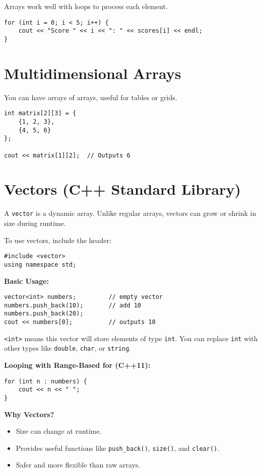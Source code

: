 \documentclass{article}
\begin{document}
Arrays work well with loops to process each element.

\begin{lstlisting}[style=cppstyle]
for (int i = 0; i < 5; i++) {
    cout << "Score " << i << ": " << scores[i] << endl;
}
\end{lstlisting}

\section{Multidimensional Arrays}

You can have arrays of arrays, useful for tables or grids.

\begin{lstlisting}[style=cppstyle]
int matrix[2][3] = {
    {1, 2, 3},
    {4, 5, 6}
};

cout << matrix[1][2];  // Outputs 6
\end{lstlisting}

\section{Vectors (C++ Standard Library)}

A \texttt{vector} is a dynamic array. Unlike regular arrays, vectors can grow or shrink in size during runtime.

To use vectors, include the header:
\begin{lstlisting}[style=cppstyle]
#include <vector>
using namespace std;
\end{lstlisting}

\textbf{Basic Usage:}
\begin{lstlisting}[style=cppstyle]
vector<int> numbers;         // empty vector
numbers.push_back(10);       // add 10
numbers.push_back(20);
cout << numbers[0];          // outputs 10
\end{lstlisting}

\texttt{<int>} means this vector will store elements of type \texttt{int}. You can replace \texttt{int} with other types like \texttt{double}, \texttt{char}, or \texttt{string}.

\textbf{Looping with Range-Based for (C++11):}
\begin{lstlisting}[style=cppstyle]
for (int n : numbers) {
    cout << n << " ";
}
\end{lstlisting}

\textbf{Why Vectors?}
\begin{itemize}
    \item Size can change at runtime.
    \item Provides useful functions like \texttt{push\_back()}, \texttt{size()}, and \texttt{clear()}.
    \item Safer and more flexible than raw arrays.
\end{itemize}
\end{document}
